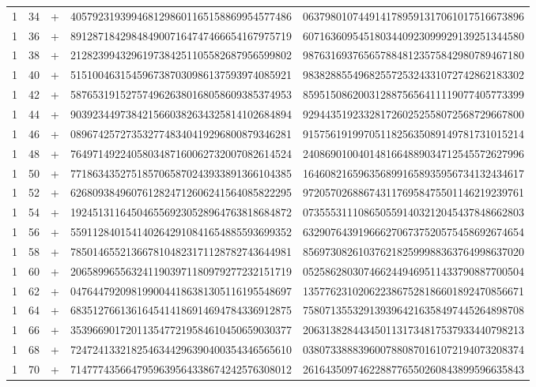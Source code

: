 \begin{longtable}{rrrll}
1 & 34 & + & 4057923193994681298601165158869954577486 & 0637980107449141789591317061017516673896 \\
1 & 36 & + & 8912871842984849007164747466654167975719 & 6071636095451803440923099929139251344580 \\
1 & 38 & + & 2128239943296197384251105582687956599802 & 9876316937656578848123575842980789467180 \\
1 & 40 & + & 5151004631545967387030986137593974085921 & 9838288554968255725324331072742862183302 \\
1 & 42 & + & 5876531915275749626380168058609385374953 & 8595150862003128875656411119077405773399 \\
1 & 44 & + & 9039234497384215660382634325814102684894 & 9294435192332817260252558072568729667800 \\
1 & 46 & + & 0896742572735327748340419296800879346281 & 9157561919970511825635089149781731015214 \\
1 & 48 & + & 7649714922405803487160062732007082614524 & 2408690100401481664889034712545572627996 \\
1 & 50 & + & 7718634352751857065870243933891366104385 & 1646082165963568991658935956734132434617 \\
1 & 52 & + & 6268093849607612824712606241564085822295 & 9720570268867431176958475501146219239761 \\
1 & 54 & + & 1924513116450465569230528964763818684872 & 0735553111086505591403212045437848662803 \\
1 & 56 & + & 5591128401541402642910841654885593699352 & 6329076439196662706737520575458692674654 \\
1 & 58 & + & 7850146552136678104823171128782743644981 & 8569730826103762182599988363764998637020 \\
1 & 60 & + & 2065899655632411903971180979277232151719 & 0525862803074662449469511433790887700504 \\
1 & 62 & + & 0476447920981990044186381305116195548697 & 1357762310206223867528186601892470856671 \\
1 & 64 & + & 6835127661361645414186914694784336912875 & 7580713553291393964216358497445264898708 \\
1 & 66 & + & 3539669017201135477219584610450659030377 & 2063138284434501131734817537933440798213 \\
1 & 68 & + & 7247241332182546344296390400354346565610 & 0380733888396007880870161072194073208374 \\
1 & 70 & + & 7147774356647959639564338674242576308012 & 2616435097462288776550260843899596635843 \\

\end{longtable}
